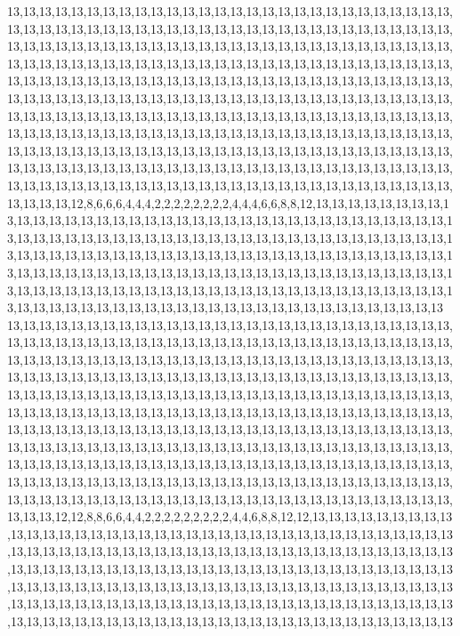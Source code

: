 13,13,13,13,13,13,13,13,13,13,13,13,13,13,13,13,13,13,13,13,13,13,13,13,13,13,13,13,13,13,13,13,13,13,13,13,13,13,13,13,13,13,13,13,13,13,13,13,13,13,13,13,13,13,13,13,13,13,13,13,13,13,13,13,13,13,13,13,13,13,13,13,13,13,13,13,13,13,13,13,13,13,13,13,13,13,13,13,13,13,13,13,13,13,13,13,13,13,13,13,13,13,13,13,13,13,13,13,13,13,13,13,13,13,13,13,13,13,13,13,13,13,13,13,13,13,13,13,13,13,13,13,13,13,13,13,13,13,13,13,13,13,13,13,13,13,13,13,13,13,13,13,13,13,13,13,13,13,13,13,13,13,13,13,13,13,13,13,13,13,13,13,13,13,13,13,13,13,13,13,13,13,13,13,13,13,13,13,13,13,13,13,13,13,13,13,13,13,13,13,13,13,13,13,13,13,13,13,13,13,13,13,13,13,13,13,13,13,13,13,13,13,13,13,13,13,13,13,13,13,13,13,13,13,13,13,13,13,13,13,13,13,13,13,13,13,13,13,13,13,13,13,13,13,13,13,13,13,13,13,13,13,13,13,13,13,13,13,13,13,13,13,13,13,13,13,13,13,13,13,13,13,13,13,13,13,13,13,13,13,13,13,13,13,13,13,13,13,13,13,13,13,13,13,13,13,13,13,13,13,13,13,12,8,6,6,6,4,4,4,2,2,2,2,2,2,2,2,4,4,4,6,6,8,8,12,13,13,13,13,13,13,13,13,13,13,13,13,13,13,13,13,13,13,13,13,13,13,13,13,13,13,13,13,13,13,13,13,13,13,13,13,13,13,13,13,13,13,13,13,13,13,13,13,13,13,13,13,13,13,13,13,13,13,13,13,13,13,13,13,13,13,13,13,13,13,13,13,13,13,13,13,13,13,13,13,13,13,13,13,13,13,13,13,13,13,13,13,13,13,13,13,13,13,13,13,13,13,13,13,13,13,13,13,13,13,13,13,13,13,13,13,13,13,13,13,13,13,13,13,13,13,13,13,13,13,13,13,13,13,13,13,13,13,13,13,13,13,13,13,13,13,13,13,13,13,13,13,13,13,13,13,13,13,13,13,13,13,13,13,13,13,13,13,13,13,13,13,13,13,13,13
13,13,13,13,13,13,13,13,13,13,13,13,13,13,13,13,13,13,13,13,13,13,13,13,13,13,13,13,13,13,13,13,13,13,13,13,13,13,13,13,13,13,13,13,13,13,13,13,13,13,13,13,13,13,13,13,13,13,13,13,13,13,13,13,13,13,13,13,13,13,13,13,13,13,13,13,13,13,13,13,13,13,13,13,13,13,13,13,13,13,13,13,13,13,13,13,13,13,13,13,13,13,13,13,13,13,13,13,13,13,13,13,13,13,13,13,13,13,13,13,13,13,13,13,13,13,13,13,13,13,13,13,13,13,13,13,13,13,13,13,13,13,13,13,13,13,13,13,13,13,13,13,13,13,13,13,13,13,13,13,13,13,13,13,13,13,13,13,13,13,13,13,13,13,13,13,13,13,13,13,13,13,13,13,13,13,13,13,13,13,13,13,13,13,13,13,13,13,13,13,13,13,13,13,13,13,13,13,13,13,13,13,13,13,13,13,13,13,13,13,13,13,13,13,13,13,13,13,13,13,13,13,13,13,13,13,13,13,13,13,13,13,13,13,13,13,13,13,13,13,13,13,13,13,13,13,13,13,13,13,13,13,13,13,13,13,13,13,13,13,13,13,13,13,13,13,13,13,13,13,13,13,13,13,13,13,13,13,13,13,13,13,13,13,13,13,13,13,13,13,13,13,13,13,13,13,13,13,13,13,13,12,12,8,8,6,6,4,4,2,2,2,2,2,2,2,2,2,4,4,6,8,8,12,12,13,13,13,13,13,13,13,13,13,13,13,13,13,13,13,13,13,13,13,13,13,13,13,13,13,13,13,13,13,13,13,13,13,13,13,13,13,13,13,13,13,13,13,13,13,13,13,13,13,13,13,13,13,13,13,13,13,13,13,13,13,13,13,13,13,13,13,13,13,13,13,13,13,13,13,13,13,13,13,13,13,13,13,13,13,13,13,13,13,13,13,13,13,13,13,13,13,13,13,13,13,13,13,13,13,13,13,13,13,13,13,13,13,13,13,13,13,13,13,13,13,13,13,13,13,13,13,13,13,13,13,13,13,13,13,13,13,13,13,13,13,13,13,13,13,13,13,13,13,13,13,13,13,13,13,13,13,13,13,13,13,13,13,13,13,13,13,13,13,13,13,13,13,13,13,13,13
